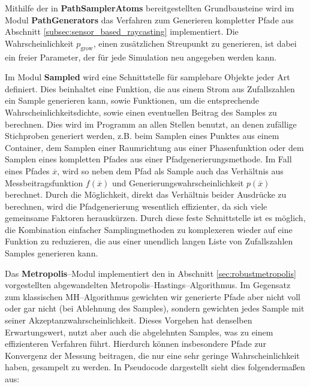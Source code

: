 	Mithilfe der in \textbf{PathSamplerAtoms} bereitgestellten Grundbausteine wird im Modul \textbf{PathGenerators} das Verfahren zum Generieren kompletter Pfade aus Abschnitt \ref{subsec:sensor_based_raycasting} implementiert. Die Wahrscheinlichkeit $p_\text{grow}$, einen zu\-sätz\-lich\-en Streupunkt zu generieren, ist dabei ein freier Parameter, der für jede Simulation neu angegeben werden kann.
	
	Im Modul \textbf{Sampled} wird eine Schnittstelle für samplebare Objekte jeder Art definiert. Dies beinhaltet eine Funktion, die aus einem Strom aus Zufallszahlen ein Sample generieren kann, sowie Funktionen, um die entsprechende Wahrscheinlichkeitsdichte, sowie einen eventuellen Beitrag des Samples zu berechnen. Dies wird im Programm an allen Stellen benutzt, an denen zufällige Stichproben generiert werden, z.B. beim Samplen eines Punktes aus einem Container, dem Samplen einer Raumrichtung aus einer Phasenfunktion oder dem Samplen eines kompletten Pfades aus einer Pfadgenerierungsmethode. Im Fall eines Pfades ${\overline x}$, wird so neben dem Pfad als Sample auch das Verhältnis aus Messbeitragsfunktion $f({\overline x})$ und Generierungswahrscheinlichkeit $p({\overline x})$ berechnet. Durch die Möglichkeit, direkt das Verhältnis beider Ausdrücke zu berechnen, wird die Pfadgenerierung wesentlich effizienter, da sich viele gemeinsame Faktoren herauskürzen. Durch diese feste Schnittstelle ist es möglich, die Kombination einfacher Samplingmethoden zu komplexeren wieder auf eine Funktion zu reduzieren, die aus einer unendlich langen Liste von Zufallszahlen Samples generieren kann.
	
	Das \textbf{Metropolis}--Modul implementiert den in Abschnitt \ref{sec:robustmetropolis} vorgestellten abgewandelten Metropolis--Hastings--Algorithmus. Im Gegensatz zum klassischen MH--Algorithmus gewichten wir generierte Pfade aber nicht voll oder gar nicht (bei Ablehnung des Samples), sondern gewichten jedes Sample mit seiner Akzeptanzwahrscheinlichkeit. Dieses Vorgehen hat denselben Erwartungswert, nutzt aber auch die abgelehnten Samples, was zu einem effizienteren Verfahren führt. Hierdurch können insbesondere Pfade zur Konvergenz der Messung beitragen, die nur eine sehr geringe Wahrscheinlichkeit haben, gesampelt zu werden. In Pseudocode dargestellt sieht dies folgendermaßen aus:
	

